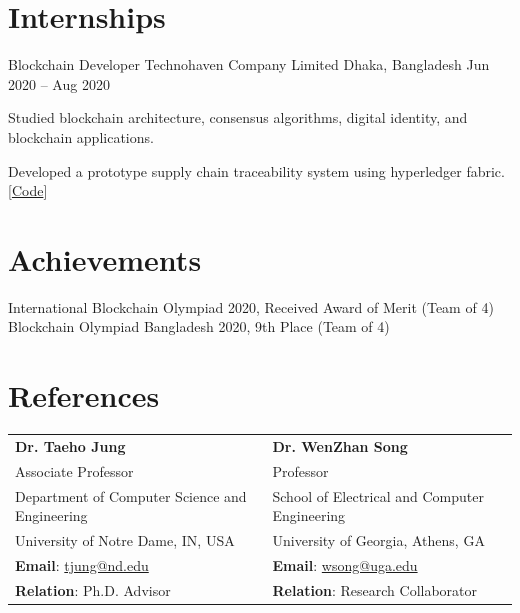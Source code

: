 \documentclass{academic-cv}
\begin{document}
\section{Internships}
\begin{cventries}
    \cventry
        {Blockchain Developer}
        {Technohaven Company Limited}
        {Dhaka, Bangladesh}
        {Jun 2020 -- Aug 2020}
        \begin{cvitems}
            \item Studied blockchain architecture, consensus algorithms, digital identity, and blockchain applications.
            \item Developed a prototype supply chain traceability system using hyperledger fabric. [\href{https://github.com/showkoth/echain}{Code}]
        \end{cvitems}
\end{cventries}

\section{Achievements}
International Blockchain Olympiad 2020, Received Award of Merit (Team of 4)\\
Blockchain Olympiad Bangladesh 2020, 9th Place (Team of 4)

\section{References}
\vspace{0.5em}
\begin{tabularx}{\textwidth}{@{}X X@{}}
\textbf{Dr. Taeho Jung} & \textbf{Dr. WenZhan Song} \\
Associate Professor & Professor \\
Department of Computer Science and Engineering & School of Electrical and Computer Engineering \\
University of Notre Dame, IN, USA & University of Georgia, Athens, GA \\
\textbf{Email}: \href{mailto:tjung@nd.edu}{tjung@nd.edu} & \textbf{Email}: \href{mailto:wsong@uga.edu}{wsong@uga.edu} \\
\textbf{Relation}: Ph.D. Advisor & \textbf{Relation}: Research Collaborator \\
\end{tabularx}
\end{document}
